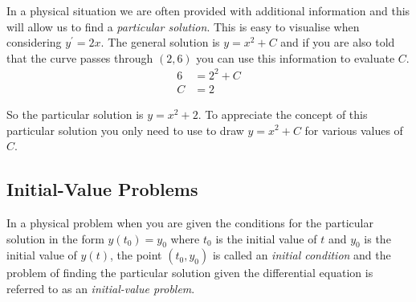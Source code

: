 In a physical situation we are often provided with additional information and this will allow us to find a \emph{particular solution}.  This is easy to visualise when considering $y^{ \prime } =2 x\text{.}$  The general solution is $y =x^{2} +C$ and if you are also told that the curve passes through $\left (2 ,6\right )$ you can use this information to evaluate $C\text{.}$
\begin{align*}6 &    = 2^{2} +C \\
C &    = 2\end{align*}

So the particular solution is $y =x^{2} +2$.  To appreciate the concept of this particular solution you only need to use \desmos to
draw $y =x^{2} +C$ for various values of $C$. 

\subsection*{Initial-Value Problems}
In a physical problem when you are given the conditions for the particular solution in the form $y (t_{0}) =y_{0}$ where $t_{0}$ is the initial value of $t$ and $y_{0}$ is the initial value of $y (t)$, the point $\left (t_{0} ,y_{0}\right )$ is called an \emph{initial condition} and the
problem of finding the particular solution given the differential equation is referred to as an \emph{initial-value problem}. 

